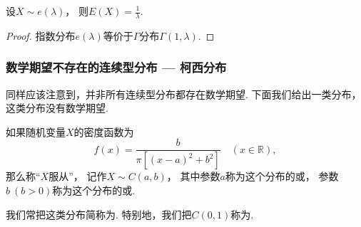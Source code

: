\begin{theorem}\label{theorem:随机变量的数字特征.指数分布的数学期望}
设\(X \sim e(\lambda)\)，
则\(E(X) = \frac1\lambda\).
\begin{proof}
指数分布\(e(\lambda)\)等价于\(\Gamma\)分布\(\Gamma(1,\lambda)\).
\end{proof}
\end{theorem}

\subsubsection{数学期望不存在的连续型分布 --- 柯西分布}
同样应该注意到，并非所有连续型分布都存在数学期望.
下面我们给出一类分布，这类分布没有数学期望.

\begin{definition}
如果随机变量\(X\)的密度函数为\begin{equation*}
	f(x) = \frac{b}{\pi[(x-a)^2+b^2]}
	\quad(x\in\mathbb{R}),
\end{equation*}
那么称“\(X\)服从”，
记作\(X \sim C(a,b)\)，
其中参数\(a\)称为这个分布的或，
参数\(b\ (b>0)\)称为这个分布的或.

我们常把这类分布简称为.
特别地，我们把\(C(0,1)\)称为.
\end{definition}

